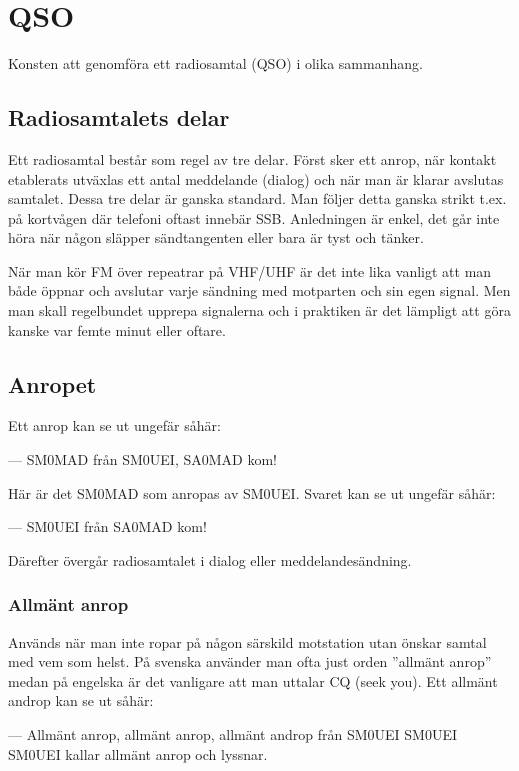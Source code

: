 \section{QSO}

Konsten att genomföra ett radiosamtal (QSO) i olika sammanhang.

\subsection{Radiosamtalets delar}

Ett radiosamtal består som regel av tre delar. Först sker ett anrop, när kontakt etablerats utväxlas ett antal meddelande (dialog) och när man är klarar avslutas samtalet. Dessa tre delar är ganska standard. Man följer detta ganska strikt t.ex. på kortvågen där telefoni oftast innebär SSB. Anledningen är enkel, det går inte höra när någon släpper sändtangenten eller bara är tyst och tänker.

När man kör FM över repeatrar på VHF/UHF är det inte lika vanligt att man både öppnar och avslutar varje sändning med motparten och sin egen signal. Men man skall regelbundet upprepa signalerna och i praktiken är det lämpligt att göra kanske var femte minut eller oftare.

\subsection{Anropet}

Ett anrop kan se ut ungefär såhär:

--- SM0MAD från SM0UEI, SA0MAD kom!

Här är det SM0MAD som anropas av SM0UEI. Svaret kan se ut ungefär såhär:

--- SM0UEI från SA0MAD kom!

Därefter övergår radiosamtalet i dialog eller meddelandesändning.

\subsubsection{Allmänt anrop} 

Används när man inte ropar på någon särskild motstation utan önskar samtal med vem som helst. På svenska använder man ofta just orden ''allmänt anrop'' medan på engelska är det vanligare att man uttalar CQ (seek you). Ett allmänt androp kan se ut såhär:

--- Allmänt anrop, allmänt anrop, allmänt androp från SM0UEI SM0UEI SM0UEI kallar allmänt anrop och lyssnar.

